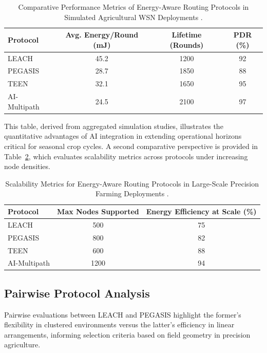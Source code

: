 \documentclass[12pt]{article}
\begin{document}
\begin{table}[htbp]
\centering
\small
\caption{Comparative Performance Metrics of Energy-Aware Routing Protocols in Simulated Agricultural WSN Deployments \cite{Jawad2017}.}
\label{tab:comparison}
\begin{tabular}{lccc}
\toprule
Protocol & Avg. Energy/Round (mJ) & Lifetime (Rounds) & PDR (\%) \\
\midrule
LEACH & 45.2 & 1200 & 92 \\
PEGASIS & 28.7 & 1850 & 88 \\
TEEN & 32.1 & 1650 & 95 \\
AI-Multipath & 24.5 & 2100 & 97 \\
\bottomrule
\end{tabular}
\end{table}

This table, derived from aggregated simulation studies, illustrates the quantitative advantages of AI integration in extending operational horizons critical for seasonal crop cycles. A second comparative perspective is provided in Table~\ref{tab:scalability}, which evaluates scalability metrics across protocols under increasing node densities.

\begin{table}[htbp]
\centering
\small
\caption{Scalability Metrics for Energy-Aware Routing Protocols in Large-Scale Precision Farming Deployments \cite{Bekal2024}.}
\label{tab:scalability}
\begin{tabular}{lcc}
\toprule
Protocol & Max Nodes Supported & Energy Efficiency at Scale (\%) \\
\midrule
LEACH & 500 & 75 \\
PEGASIS & 800 & 82 \\
TEEN & 600 & 88 \\
AI-Multipath & 1200 & 94 \\
\bottomrule
\end{tabular}
\end{table}

\subsection{Pairwise Protocol Analysis}

Pairwise evaluations between LEACH and PEGASIS highlight the former's flexibility in clustered environments versus the latter's efficiency in linear arrangements, informing selection criteria based on field geometry in precision agriculture.
\end{document}
